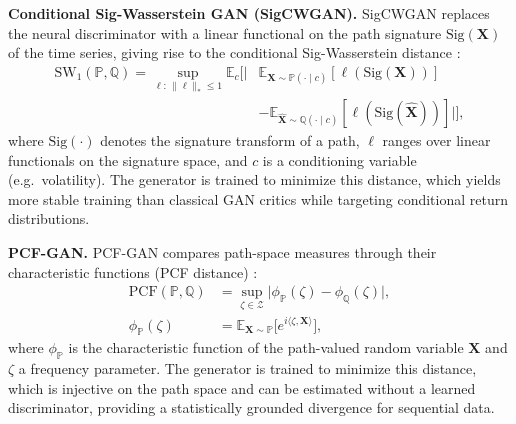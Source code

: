 \begin{enumerate}[label=\textbf{[A\arabic*]},resume]
      \item \label{alg:sigcwgan} \textbf{Conditional Sig-Wasserstein
      GAN (SigCWGAN).}
      SigCWGAN replaces the neural discriminator with a linear
      functional on the path signature \(\mathrm{Sig}(\mathbf{X})\)
      of the time series, giving rise to the conditional
      Sig-Wasserstein distance \cite{Ni21}:
      \begin{equation}
        \begin{split}
          \mathrm{SW}_1(\mathbb{P}, \mathbb{Q}) =
          \sup_{\ell:\,\|\ell\|_*\le 1} \mathbb{E}_{c}\Big[
          \big| & \mathbb{E}_{\mathbf{X}\sim\mathbb{P}(\cdot\mid c)}
          [\ell(\mathrm{Sig}(\mathbf{X}))] \\
          &- \mathbb{E}_{\hat{\mathbf{X}}\sim\mathbb{Q}(\cdot\mid c)}
          [\ell(\mathrm{Sig}(\hat{\mathbf{X}}))]\big|\Big],
        \end{split}
        \label{eq:sigcwgan}
      \end{equation}
      where \(\mathrm{Sig}(\cdot)\) denotes the signature transform
      of a path, \(\ell\) ranges over linear functionals on the
      signature space, and \(c\) is a conditioning variable (e.g.\
      volatility). The generator is trained to minimize this distance,
      which yields more stable training than classical GAN critics
      while targeting conditional return distributions.

      \item \label{alg:pcfgan} \textbf{PCF-GAN.}
      PCF-GAN compares path-space measures through their
      characteristic functions (PCF distance) \cite{Lou23}:
      \begin{equation}
        \begin{split}
          \mathrm{PCF}(\mathbb{P}, \mathbb{Q}) &=
          \sup_{\zeta\in\mathcal{Z}} \big|
          \phi_{\mathbb{P}}(\zeta) - \phi_{\mathbb{Q}}(\zeta)\big|, \\
          \phi_{\mathbb{P}}(\zeta) &=
          \mathbb{E}_{\mathbf{X}\sim\mathbb{P}}\big[e^{i\langle\zeta,
          \mathbf{X}\rangle}\big],
        \end{split}
        \label{eq:pcfgan}
      \end{equation}
      where \(\phi_{\mathbb{P}}\) is the characteristic function of
      the path-valued random variable \(\mathbf{X}\) and \(\zeta\)
      a frequency parameter. The generator is trained to minimize this
      distance, which is injective on the path space and can be
      estimated without a learned discriminator, providing a
      statistically grounded divergence for sequential data.
    \end{enumerate}

